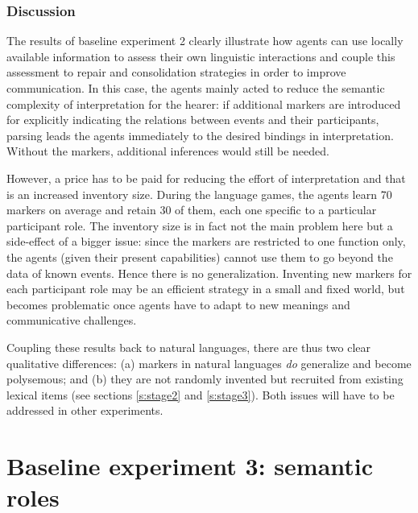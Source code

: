 \subsubsection{Discussion}
 The results of baseline experiment 2 clearly illustrate how agents can use locally available information to assess their own linguistic interactions and couple this assessment to repair and consolidation strategies in order to improve communication. In this case, the agents mainly acted to reduce the semantic complexity of interpretation for the hearer: if additional markers are introduced for explicitly indicating the relations between events and their participants, parsing leads the agents immediately to the desired bindings in interpretation. Without the markers, additional inferences would still be needed.

However, a price has to be paid for reducing the effort of interpretation and that is an increased inventory size. During the language games, the agents learn 70 markers on average and retain 30 of them, each one specific to a particular participant role. The inventory size is in fact not the main problem here but a side-effect of a bigger issue: since the markers are restricted to one function only, the agents (given their present capabilities) cannot use them to go beyond the data of known events. Hence there is no generalization. Inventing new markers for each participant role may be an efficient strategy in a small and fixed world, but becomes problematic once agents have to adapt to new meanings and communicative challenges.

Coupling these results back to natural languages, there are thus two clear qualitative differences: (a) markers in natural languages {\em do} generalize and become polysemous; and (b) they are not randomly invented but recruited from existing lexical items (see sections \ref{s:stage2} and \ref{s:stage3}). Both issues will have to be addressed in other experiments.


\section{Baseline experiment 3: semantic roles}
\label{s:base3}

